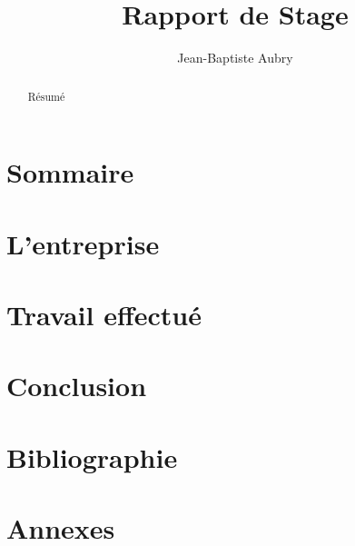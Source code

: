 \documentclass[a4paper, 11pt, frenchb]{article}
\title{Rapport de Stage}
\author{Jean-Baptiste Aubry}
\begin{document}
\maketitle

\begin{abstract}
    Résumé
\end{abstract}

\section{Sommaire}

\section{L'entreprise}

\section{Travail effectué}

\section{Conclusion}

\section{Bibliographie}

\section{Annexes}

\tableofcontents
\end{document}
